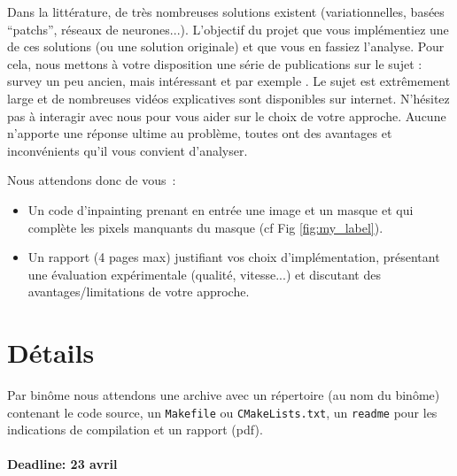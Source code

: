 \documentclass{article}
\begin{document}
Dans la littérature, de très nombreuses solutions existent
(variationnelles, basées ``patchs'', réseaux de
neurones...). L'objectif du projet que vous implémentiez une de ces
solutions (ou une solution originale) et que vous en fassiez
l'analyse. Pour cela, nous mettons à votre disposition une série de
publications sur le sujet : survey un peu ancien, mais intéressant
\cite{bertalmio2014inpainting} et par exemple
\cite{masnou1998level,criminisi2003object,barnes2009patchmatch,2017arXiv171203111L}.
Le sujet est extrêmement large et de nombreuses vidéos explicatives
sont disponibles sur internet. N'hésitez pas à interagir avec nous
pour vous aider sur le choix de votre approche. Aucune n'apporte une
réponse ultime au problème, toutes ont des avantages et inconvénients
qu'il vous convient d'analyser.

Nous attendons donc de vous~:
\begin{itemize}
\item Un code d'inpainting prenant en entrée une image et un masque et
  qui complète les pixels manquants du masque (cf Fig
  \ref{fig:my_label}).
\item Un rapport (4 pages max) justifiant vos choix d'implémentation,
  présentant une évaluation expérimentale (qualité, vitesse...) et discutant des
  avantages/limitations de votre approche.
\end{itemize}


\section*{Détails}


Par binôme nous attendons une archive avec un répertoire (au nom du
binôme) contenant le code source, un \texttt{Makefile} ou
\texttt{CMakeLists.txt}, un \texttt{readme} pour les indications de
compilation et un rapport (pdf).
\\
\\
\noindent\textbf{Deadline: 23 avril}



\end{document}
